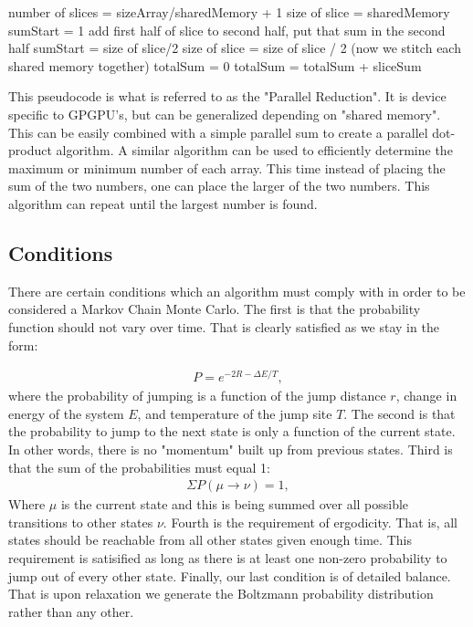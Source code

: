 \begin{varwidth}{\dimexpr{}\fboxrule\relax}
\begin{algorithmic}[1]
\State number of slices = sizeArray/sharedMemory + 1
\State size of slice = sharedMemory
\State sumStart = 1
\State add first half of slice to second half, put that sum in the second half
\EndFor
\State sumStart = size of slice/2
\State size of slice  = size of slice / 2
\EndFor
\EndFor
\State (now we stitch each shared memory together)
\State totalSum = 0
\State totalSum = totalSum + sliceSum
\EndFor

This pseudocode is what is referred to as the "Parallel Reduction". It is device specific to GPGPU's, but can be generalized depending on "shared memory". This can be easily combined with a simple parallel sum to create a parallel dot-product algorithm. A similar algorithm can be used to efficiently determine the maximum or minimum number of each array. This time instead of placing the sum of the two numbers, one can place the larger of the two numbers. This algorithm can repeat until the largest number is found.
\end{algorithmic}
\end{varwidth}%

\subsection{Conditions}
There are certain conditions which an algorithm must comply with in order to be considered a Markov Chain Monte Carlo. The first is that the probability function should not vary over time. That is clearly satisfied as we stay in the form:

\begin{eqnarray}
P = e^{-2R - \Delta E/T},
\label{simpleProb}
\end{eqnarray}
where the probability of jumping is a function of the jump distance $r$, change in energy of the system $E$, and temperature of the jump site $T$. The second is that the probability to jump to the next state is only a function of the current state. In other words, there is no "momentum" built up from previous states. Third is that the sum of the probabilities must equal 1:
\begin{eqnarray}
\Sigma P(\mu \rightarrow \nu) = 1 ,
\label{normalized}
\end{eqnarray}
Where $\mu$ is the current state and this is being summed over all possible transitions to other states $\nu$. Fourth is the requirement of ergodicity. That is, all states should be reachable from all other states given enough time. This requirement is satisified as long as there is at least one non-zero probability to jump out of every other state. Finally, our last condition is of detailed balance. That is upon relaxation we generate the Boltzmann probability distribution rather than any other.

